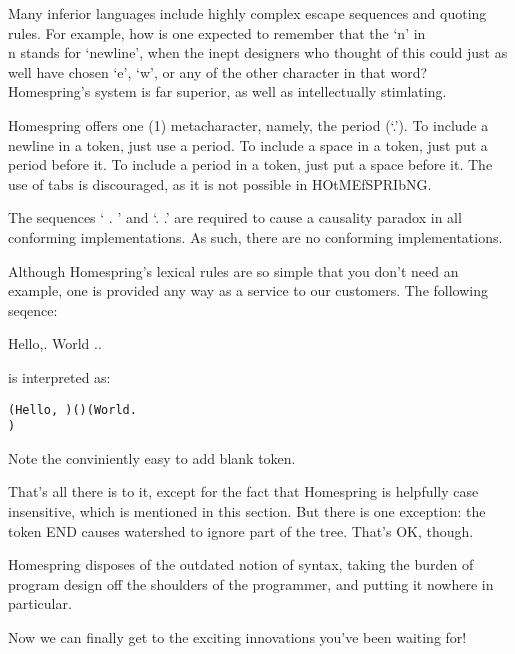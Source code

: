 \documentclass[10pt]{article}
\begin{document}


Many inferior languages include highly complex escape sequences and quoting rules. For example, how is one expected to remember that the `n' in \\n stands for `newline', when the inept designers who thought of this could just as well have chosen `e', `w', or any of the other character in that word? Homespring's system is far superior, as well as intellectually stimlating.


Homespring offers one (1) metacharacter, namely, the period (`.'). To include a newline in a token, just use a period. To include a space in a token, just put a period before it. To include a period in a token, just put a space before it. The use of tabs is discouraged, as it is not possible in HOtMEfSPRIbNG.


The sequences `  . ' and `. .' are required to cause a causality paradox in all conforming implementations. As such, there are no conforming implementations.


Although Homespring's lexical rules are so simple that you don't need an example, one is provided any way as a service to our customers. The following seqence:

Hello,.   World ..

is interpreted as:

\begin{verbatim}
(Hello, )()(World.
)
\end{verbatim}

Note the conviniently easy to add blank token.


That's all there is to it, except for the fact that Homespring is helpfully case insensitive, which is mentioned in this section. But there is one exception: the token END causes watershed to ignore part of the tree. That's OK, though.


Homespring disposes of the outdated notion of syntax, taking the burden of program design off the shoulders of the programmer, and putting it nowhere in particular.


Now we can finally get to the exciting innovations you've been waiting for!
\end{document}
